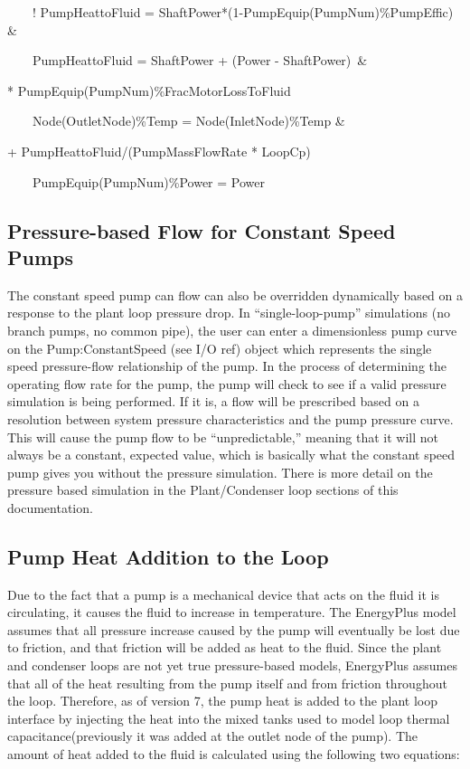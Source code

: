 ~~~~! PumpHeattoFluid = ShaftPower*(1-PumpEquip(PumpNum)\%PumpEffic)~ \&

~~~~PumpHeattoFluid = ShaftPower + (Power - ShaftPower)~\& \par
\hspace{5cm} * PumpEquip(PumpNum)\%FracMotorLossToFluid

~~~~Node(OutletNode)\%Temp = Node(InletNode)\%Temp \& \par
\hspace{6cm} + PumpHeattoFluid/(PumpMassFlowRate * LoopCp)

~~~~PumpEquip(PumpNum)\%Power = Power

\subsection{Pressure-based Flow for Constant Speed Pumps}\label{pressure-based-flow-for-constant-speed-pumps}

The constant speed pump can flow can also be overridden dynamically based on a response to the plant loop pressure drop. In ``single-loop-pump'' simulations (no branch pumps, no common pipe), the user can enter a dimensionless pump curve on the Pump:ConstantSpeed (see I/O ref) object which represents the single speed pressure-flow relationship of the pump. In the process of determining the operating flow rate for the pump, the pump will check to see if a valid pressure simulation is being performed. If it is, a flow will be prescribed based on a resolution between system pressure characteristics and the pump pressure curve. This will cause the pump flow to be ``unpredictable,'' meaning that it will not always be a constant, expected value, which is basically what the constant speed pump gives you without the pressure simulation. There is more detail on the pressure based simulation in the Plant/Condenser loop sections of this documentation.

\subsection{Pump Heat Addition to the Loop}\label{pump-heat-addition-to-the-loop}

Due to the fact that a pump is a mechanical device that acts on the fluid it is circulating, it causes the fluid to increase in temperature. The EnergyPlus model assumes that all pressure increase caused by the pump will eventually be lost due to friction, and that friction will be added as heat to the fluid. Since the plant and condenser loops are not yet true pressure-based models, EnergyPlus assumes that all of the heat resulting from the pump itself and from friction throughout the loop. Therefore, as of version 7, the pump heat is added to the plant loop interface by injecting the heat into the mixed tanks used to model loop thermal capacitance(previously it was added at the outlet node of the pump). The amount of heat added to the fluid is calculated using the following two equations:

